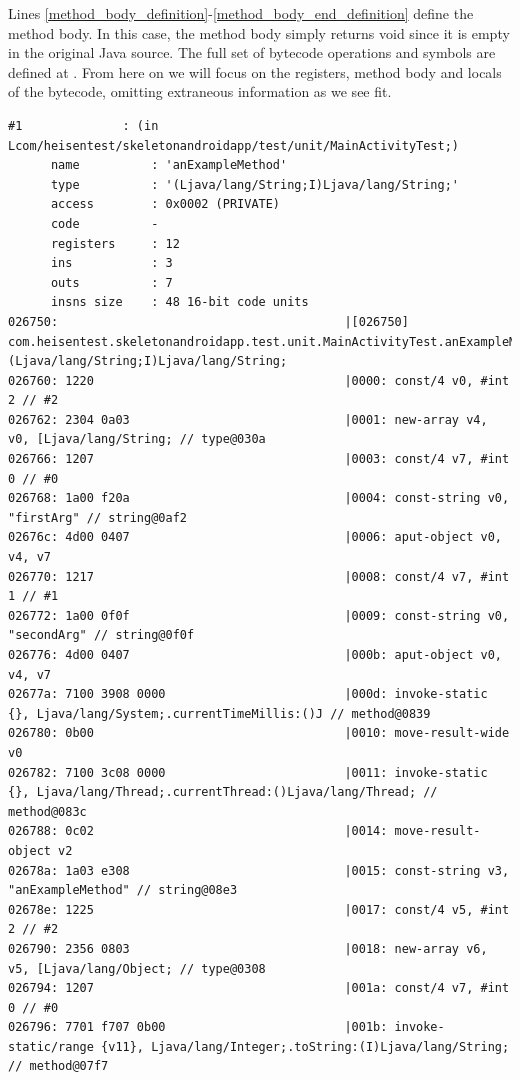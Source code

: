 Lines \ref{method_body_definition}-\ref{method_body_end_definition} define the
method body. In this case, the method body simply returns void since it is empty
in the original Java source. The full set of bytecode operations and symbols are
defined at \cite{dalvikBytecode}. From here on we will focus on the
registers, method body and locals of the bytecode, omitting extraneous
information as we see fit.

\begin{lstlisting}[label=instrumented_example]
    #1              : (in Lcom/heisentest/skeletonandroidapp/test/unit/MainActivityTest;)
      name          : 'anExampleMethod'
      type          : '(Ljava/lang/String;I)Ljava/lang/String;'
      access        : 0x0002 (PRIVATE)
      code          -
      registers     : 12
      ins           : 3
      outs          : 7
      insns size    : 48 16-bit code units
026750:                                        |[026750] com.heisentest.skeletonandroidapp.test.unit.MainActivityTest.anExampleMethod:(Ljava/lang/String;I)Ljava/lang/String;
026760: 1220                                   |0000: const/4 v0, #int 2 // #2
026762: 2304 0a03                              |0001: new-array v4, v0, [Ljava/lang/String; // type@030a
026766: 1207                                   |0003: const/4 v7, #int 0 // #0
026768: 1a00 f20a                              |0004: const-string v0, "firstArg" // string@0af2
02676c: 4d00 0407                              |0006: aput-object v0, v4, v7
026770: 1217                                   |0008: const/4 v7, #int 1 // #1
026772: 1a00 0f0f                              |0009: const-string v0, "secondArg" // string@0f0f
026776: 4d00 0407                              |000b: aput-object v0, v4, v7
02677a: 7100 3908 0000                         |000d: invoke-static {}, Ljava/lang/System;.currentTimeMillis:()J // method@0839
026780: 0b00                                   |0010: move-result-wide v0
026782: 7100 3c08 0000                         |0011: invoke-static {}, Ljava/lang/Thread;.currentThread:()Ljava/lang/Thread; // method@083c
026788: 0c02                                   |0014: move-result-object v2
02678a: 1a03 e308                              |0015: const-string v3, "anExampleMethod" // string@08e3
02678e: 1225                                   |0017: const/4 v5, #int 2 // #2
026790: 2356 0803                              |0018: new-array v6, v5, [Ljava/lang/Object; // type@0308
026794: 1207                                   |001a: const/4 v7, #int 0 // #0
026796: 7701 f707 0b00                         |001b: invoke-static/range {v11}, Ljava/lang/Integer;.toString:(I)Ljava/lang/String; // method@07f7

\end{lstlisting}
